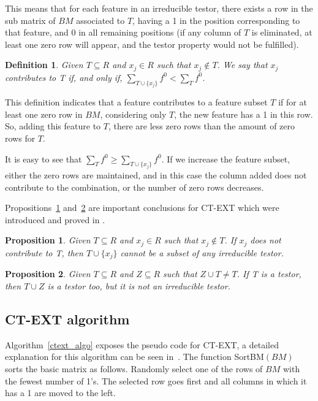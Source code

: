 \documentclass[authoryear,preprint,review,12pt]{elsarticle}
\newtheorem{definition}{Definition}
\newtheorem{proposition}{Proposition}
\begin{document}
This means that for each feature in an irreducible testor, there exists a row in 
the sub matrix of $BM$ associated to $T$, having a 1 in the position corresponding
to that feature, and 0 in all remaining positions (if any column of $T$ is eliminated, 
at least one zero row will appear, and the testor property would not be fulfilled). 

\begin{definition} \label{def25} Given $T \subseteq R$ and $x_j \in R$ such that $x_j \notin T$. 
We say that $x_j$ contributes to T if, and only if, $\sum_{T\cup\{x_j\}} f^0 < \sum_T f^0$.
\end{definition}
This definition indicates that a feature contributes to a feature subset $T$
if for at least one zero row in $BM$, considering only $T$, the new feature has a 1 in 
this row. So, adding this feature to $T$, there are less
zero rows than the amount of zero rows for $T$.

It is easy to see that $\sum_T f^0 \geq \sum_{T\cup\{x_j\}} f^0$. If we
increase the feature subset, either the zero rows are maintained, and in this
case the column added does not contribute to the combination, or the number of zero rows decreases.

Propositions~\ref{prop1} and~\ref{prop2} are important conclusions for CT-EXT which were introduced and 
proved in \citep{R22}.

\begin{proposition}\label{prop1} Given $T \subseteq R$ and  $x_j \in R$ such that $x_j \notin T$. If $x_j$ does not contribute to T, then $T\cup\{x_j\}$ cannot be a subset of any irreducible testor.
\end{proposition}

\begin{proposition}\label{prop2} Given $T \subseteq R$ and $Z \subseteq R$ such that $Z \cup T \neq T$. If T is a testor, 
then $T \cup Z$ is a testor too, but it is not an irreducible testor.
\end{proposition}

\subsection{CT-EXT algorithm}
Algorithm~\ref{ctext_algo} exposes the pseudo code for CT-EXT, a detailed explanation for 
this algorithm can be seen in~\citep{R22}. The function SortBM$(BM)$ sorts the basic matrix as follows.
Randomly select one of the rows of $BM$ with the fewest number of 1's. The selected row goes first and 
all columns in which it has a 1 are moved to the left.  
\end{document}

